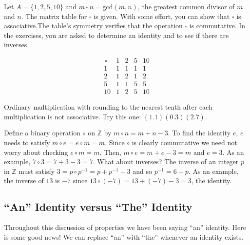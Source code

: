 \documentclass[12pt]{book}
\theoremstyle{definition}
\def\Z{\mathbb{Z}}
\begin{document}
\begin{tcexample}{}{}
Let $A=\{1,2,5,10\}$ and $m\,\square\, n = \text{gcd}(m,n)$, the greatest common divisor of $m$ and $n$.  The matrix table for $\square$ is given.  With some effort, you can show that $\square$ is associative.The table's symmetry verifies that the operation $\square$ is commutative.  In the exercises, you are asked to determine an identity and to see if there are inverses.
\begin{minipage}{3.5in}
	$$\begin{array}{c|cccc}
	\,\square\, & 1 & 2 & 5& 10\\
	\hline
	1 & 1 & 1 & 1 &1\\
	2 & 1 & 2 & 1 & 2\\
	5 & 1 & 1 & 5 & 5\\
	10 & 1 & 2 & 5 & 10
	\end{array}$$

	
\end{minipage}

\end{tcexample}

\begin{tcexample}{}{}
 Ordinary multiplication with rounding to the nearest tenth after each multiplication is not associative. Try this one: $ (1.1)(0.3)(2.7) $.
\end{tcexample}

\begin{tcexample}{}{}
Define a binary operation $ \circ $ on $ \Z  $ by $ m\circ n=m+n-3. $ To find the identity $ e $, $ e $ needs to satisfy $ m\circ e=e\circ m= m. $ Since $ \circ $ is clearly commutative we need not worry about checking $ e\circ m=m. $ Then, $ m\circ e= m+e-3=m $ and $ e=3 $. As an example, $ 7\circ 3=7+3-3=7 $. What about inverses? The inverse of an integer $ p $ in $ \Z $ must satisfy $ 3=p\circ p^{-1}=p+p^{-1}-3 $ and so $ p^{-1}=6-p. $ As an example, the inverse of $ 13 $ is $ -7 $ since $ 13\circ (-7)=13+(-7)-3=3 $, the identity.
\end{tcexample}

\subsection{``An'' Identity versus ``The'' Identity}
Throughout this discussion of properties we have been saying ``an'' identity.  Here is some good news!  We can replace ``an'' with ``the'' whenever an identity exists.\\
\end{document}
